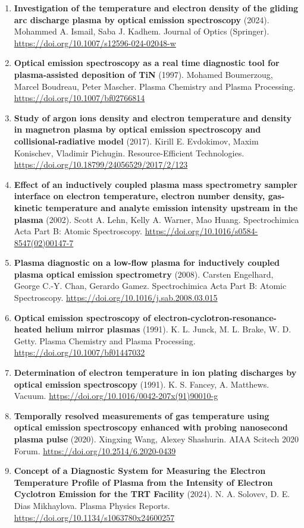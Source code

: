 \documentclass[11pt,a4paper]{article}
\begin{document}
\begin{enumerate}[leftmargin=1.4em]
\item \textbf{Investigation of the temperature and electron density of the gliding arc discharge plasma by optical emission spectroscopy} (2024). Mohammed A. Ismail, Saba J. Kadhem. Journal of Optics (Springer). \url{https://doi.org/10.1007/s12596-024-02048-w}
\item \textbf{Optical emission spectroscopy as a real time diagnostic tool for plasma-assisted deposition of TiN} (1997). Mohamed Boumerzoug, Marcel Boudreau, Peter Mascher. Plasma Chemistry and Plasma Processing. \url{https://doi.org/10.1007/bf02766814}
\item \textbf{Study of argon ions density and electron temperature and density in magnetron plasma by optical emission spectroscopy and collisional-radiative model} (2017). Kirill E. Evdokimov, Maxim Konischev, Vladimir Pichugin. Resource-Efficient Technologies. \url{https://doi.org/10.18799/24056529/2017/2/123}
\item \textbf{Effect of an inductively coupled plasma mass spectrometry sampler interface on electron temperature, electron number density, gas-kinetic temperature and analyte emission intensity upstream in the plasma} (2002). Scott A. Lehn, Kelly A. Warner, Mao Huang. Spectrochimica Acta Part B: Atomic Spectroscopy. \url{https://doi.org/10.1016/s0584-8547(02)00147-7}
\item \textbf{Plasma diagnostic on a low-flow plasma for inductively coupled plasma optical emission spectrometry} (2008). Carsten Engelhard, George C.-Y. Chan, Gerardo Gamez. Spectrochimica Acta Part B: Atomic Spectroscopy. \url{https://doi.org/10.1016/j.sab.2008.03.015}
\item \textbf{Optical emission spectroscopy of electron-cyclotron-resonance-heated helium mirror plasmas} (1991). K. L. Junck, M. L. Brake, W. D. Getty. Plasma Chemistry and Plasma Processing. \url{https://doi.org/10.1007/bf01447032}
\item \textbf{Determination of electron temperature in ion plating discharges by optical emission spectroscopy} (1991). K. S. Fancey, A. Matthews. Vacuum. \url{https://doi.org/10.1016/0042-207x(91)90010-g}
\item \textbf{Temporally resolved measurements of gas temperature using optical emission spectroscopy enhanced with probing nanosecond plasma pulse} (2020). Xingxing Wang, Alexey Shashurin. AIAA Scitech 2020 Forum. \url{https://doi.org/10.2514/6.2020-0439}
\item \textbf{Concept of a Diagnostic System for Measuring the Electron Temperature Profile of Plasma from the Intensity of Electron Cyclotron Emission for the TRT Facility} (2024). N. A. Solovev, D. E. Dias Mikhaylova. Plasma Physics Reports. \url{https://doi.org/10.1134/s1063780x24600257}

\end{enumerate}
\end{document}
